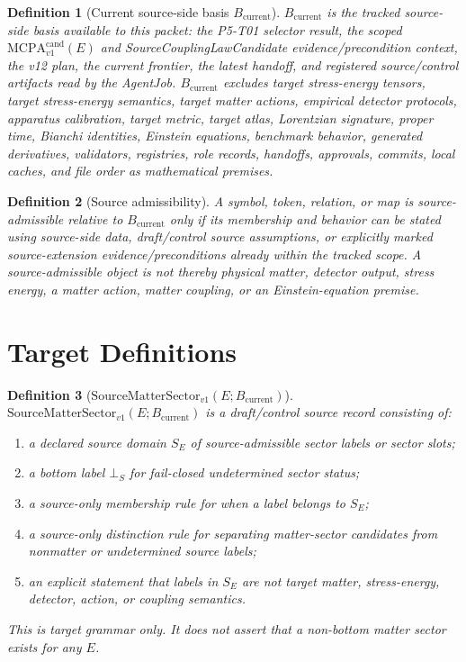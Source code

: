 \documentclass[11pt]{article}
\newcommand{\MCPA}{\mathrm{MCPA}^{\mathrm{cand}}_{v1}}
\newcommand{\Bcur}{B_{\mathrm{current}}}
\newcommand{\MatterSector}{\mathrm{SourceMatterSector}_{v1}}
\newtheorem{definition}{Definition}
\begin{document}
\begin{definition}[Current source-side basis \(\Bcur\)]
\(\Bcur\) is the tracked source-side basis available to this packet: the
P5-T01 selector result, the scoped \(\MCPA(E)\) and
SourceCouplingLawCandidate evidence/precondition context, the v12 plan, the
current frontier, the latest handoff, and registered source/control artifacts
read by the AgentJob. \(\Bcur\) excludes target stress-energy tensors, target
stress-energy semantics, target matter actions, empirical detector protocols,
apparatus calibration, target metric, target atlas, Lorentzian signature,
proper time, Bianchi identities, Einstein equations, benchmark behavior,
generated derivatives, validators, registries, role records, handoffs,
approvals, commits, local caches, and file order as mathematical premises.
\end{definition}

\begin{definition}[Source admissibility]
A symbol, token, relation, or map is source-admissible relative to \(\Bcur\)
only if its membership and behavior can be stated using source-side data,
draft/control source assumptions, or explicitly marked source-extension
evidence/preconditions already within the tracked scope. A source-admissible
object is not thereby physical matter, detector output, stress energy, a
matter action, matter coupling, or an Einstein-equation premise.
\end{definition}

\section{Target Definitions}

\begin{definition}[\(\MatterSector(E;\Bcur)\)]
\(\MatterSector(E;\Bcur)\) is a draft/control source record consisting of:
\begin{enumerate}[leftmargin=*]
\item a declared source domain \(S_E\) of source-admissible sector labels or
  sector slots;
\item a bottom label \(\bot_S\) for fail-closed undetermined sector status;
\item a source-only membership rule for when a label belongs to \(S_E\);
\item a source-only distinction rule for separating matter-sector candidates
  from nonmatter or undetermined source labels;
\item an explicit statement that labels in \(S_E\) are not target matter,
  stress-energy, detector, action, or coupling semantics.
\end{enumerate}

This is target grammar only. It does not assert that a non-bottom matter sector
exists for any \(E\).
\end{definition}
\end{document}
